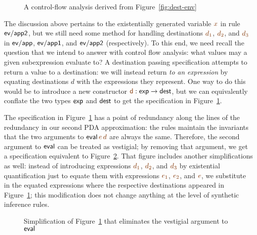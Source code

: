 \begin{figure}[t]
\caption{A control-flow analysis derived from Figure~\ref{fig:dest-env}}
\label{fig:dest-cfa-1}
\end{figure}

The discussion above pertains to the existentially generated variable
$\lf{x}$ in rule ${\sf ev/app2}$, but we still need some method for
handling destinations $\lf{d_1}$, $\lf{d_2}$, and $\lf{d_3}$ in 
${\sf ev/app}$, ${\sf
  ev/app1}$, and ${\sf ev/app2}$ (respectively). To
this end, we need recall the question that we intend to answer with
control flow analysis: what values may a given subexpression evaluate
to? A destination passing specification attempts to return a value to
a destination: we will instead return {\it to an expression} by
equating destinations $d$ with the expressions they represent. One way
to do this would be to introduce a new constructor $\lf{\sf d}: {\sf
  exp} \rightarrow {\sf dest}$, but we can equivalently conflate the
two types ${\sf exp}$ and ${\sf dest}$ to get the specification in
Figure~\ref{fig:dest-cfa-1}.


The specification in Figure~\ref{fig:dest-cfa-1} has a point of
redundancy along the lines of the redundancy in our second PDA
approximation: the rules maintain the invariants that the two
arguments to ${\sf eval}\,\lf{e}\,\lf{d}$ are always the same. Therefore, the
second argument to ${\sf eval}$ can be treated as vestigial; by
removing that argument, we get a specification equivalent to
Figure~\ref{fig:dest-cfa-2}. That figure includes another
simplifications as well: instead of introducing expressions $\lf{d_1}$,
$\lf{d_2}$, and $\lf{d_3}$ by existential quantification just to equate them
with expressions $\lf{e_1}$, $\lf{e_2}$, and $\lf{e}$, 
we substitute in the equated
expressions where the respective destinations appeared in
Figure~\ref{fig:dest-cfa-1}; this modification does not change
anything at the level of  synthetic inference rules.

\begin{figure}[t]
\caption{Simplification of Figure~\ref{fig:dest-cfa-1} that
  eliminates the vestigial argument to ${\sf eval}$}
\label{fig:dest-cfa-2}
\end{figure}

